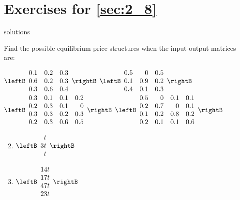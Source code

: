 \section*{Exercises for \ref{sec:2_8}}

\begin{Filesave}{solutions}
\end{Filesave}

\begin{multicols}{2}
\vspace*{-2em}
\begin{ex}
Find the possible equilibrium price structures when the input-output matrices are:
\begin{exenumerate}
\exitem $\leftB \begin{array}{rrr}
0.1 & 0.2 & 0.3 \\
0.6 & 0.2 & 0.3 \\
0.3 & 0.6 & 0.4
\end{array} \rightB$
\exitem $\leftB \begin{array}{rrr}
0.5 & 0 & 0.5 \\
0.1 & 0.9 & 0.2 \\
0.4 & 0.1 & 0.3
\end{array} \rightB$
\exitem* $\leftB \begin{array}{rrrr}
0.3 & 0.1 & 0.1 & 0.2 \\
0.2 & 0.3 & 0.1 & 0 \\
0.3 & 0.3 & 0.2 & 0.3 \\
0.2 & 0.3 & 0.6 & 0.5
\end{array} \rightB$
\exitem* $\leftB \begin{array}{rrrr}
0.5 & 0 & 0.1 & 0.1 \\
0.2 & 0.7 & 0 & 0.1 \\
0.1 & 0.2 & 0.8 & 0.2 \\
0.2 & 0.1 & 0.1 & 0.6
\end{array} \rightB$
\end{exenumerate}
\begin{sol}
\begin{enumerate}[label={\alph*.}]
\setcounter{enumi}{1}
\item $\leftB \begin{array}{r}
t \\
3t \\
t
\end{array} \rightB$

\setcounter{enumi}{3}
\item $\leftB \begin{array}{r}
14t \\
17t \\
47t \\
23t
\end{array} \rightB$


\end{enumerate}
\end{sol}
\end{ex}
\end{multicols}
